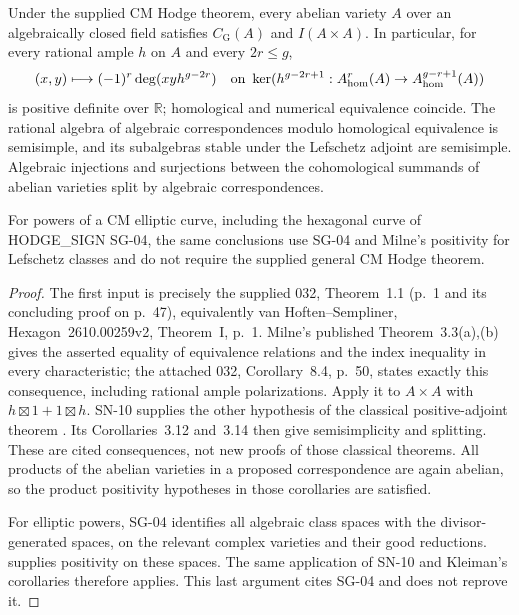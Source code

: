 \begin{theorem}
Under the supplied CM Hodge theorem, every abelian variety $A$ over an
algebraically closed field satisfies $C_{\mathrm G}(A)$ and $I(A\times A)$.
In particular, for every rational ample $h$ on $A$ and every $2r\leq g$,
\[
 (x,y)\longmapsto (-1)^r\deg(xy h^{g-2r})
 \quad\text{on }\ker(h^{g-2r+1}:A^r_{\rm hom}(A)\to A^{g-r+1}_{\rm hom}(A))
\]
is positive definite over $\mathbb R$; homological and numerical
equivalence coincide.  The rational algebra of algebraic correspondences
modulo homological equivalence is semisimple, and its subalgebras stable
under the Lefschetz adjoint are semisimple.  Algebraic injections and
surjections between the cohomological summands of abelian varieties split
by algebraic correspondences.

For powers of a CM elliptic curve, including the hexagonal curve of
HODGE\_SIGN SG-04, the same conclusions use SG-04 and Milne's positivity
for Lefschetz classes and do not require the supplied general CM Hodge
theorem.
\end{theorem}
\begin{proof}
The first input is precisely the supplied 032, Theorem~1.1 (p.~1 and its
concluding proof on p.~47), equivalently van Hoften--Sempliner,
Hexagon~2610.00259v2, Theorem~I, p.~1.  Milne's published
Theorem~3.3(a),(b) gives the asserted equality of equivalence relations and
the index inequality in every characteristic; the attached 032,
Corollary~8.4, p.~50, states exactly this consequence, including rational
ample polarizations.  Apply it to $A\times A$ with $h\boxtimes1+1\boxtimes h$.
SN-10 supplies the other hypothesis of the classical positive-adjoint
theorem \cite[Theorem~3.11]{Kleiman1968}.  Its Corollaries~3.12 and~3.14
then give semisimplicity and splitting.  These are cited consequences,
not new proofs of those classical theorems.  All products of the abelian
varieties in a proposed correspondence are again abelian, so the product
positivity hypotheses in those corollaries are satisfied.

For elliptic powers, SG-04 identifies all algebraic class spaces with the
divisor-generated spaces, on the relevant complex varieties and their
good reductions.  \cite[Remarks~3.7--3.8]{Milne2002} supplies positivity on
these spaces.  The same application of SN-10 and Kleiman's corollaries
therefore applies.  This last argument cites SG-04 and does not reprove it.
\end{proof}

